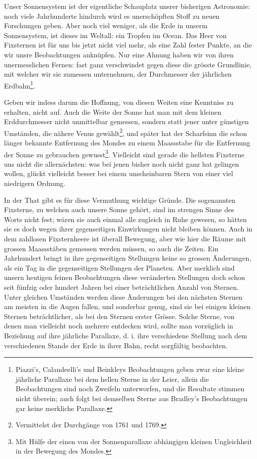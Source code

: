 \documentclass[10pt,a4paper]{article}
\begin{document}
Unser Sonnensystem ist der eigentliche Schauplatz unsrer bisherigen Astronomie: noch viele Jahrhunderte hindurch wird es unerschöpften Stoff zu neuen Forschungen geben. Aber noch viel weniger, als die Erde in unserm Sonnensystem, ist dieses im Weltall: ein Tropfen im Ocean. Das Heer von Fixsternen ist für uns bis jetzt nicht viel mehr, als eine Zahl fester Punkte, an die wir unsre Beobachtungen anknüpfen. Nur eine Ahnung haben wir von ihren unermesslichen Fernen: fast ganz verschwindet gegen diese die grösste Grundlinie, mit welcher wir sie zumessen unternehmen, der Durchmesser der jährlichen Erdbahn\footnote{Piazzi's, Calandeelli's und Beinkleys Beobachtungen geben zwar eine kleine jährliche Parallaxe bei dem hellen Sterne in der Leier, allein die Beobachtungen sind noch Zweifeln unterworfen, und die Resultate stimmen nicht überein; auch folgt bei demselben Sterne aus Bradley's Beobachtungen gar keine merkliche Parallaxe.}.

Geben wir indess darum die Hoffnung, von diesen Weiten eine Kenntniss zu erhalten, nicht auf. Auch die Weite der Sonne hat man mit dem kleinen Erddurchmesser nicht unmittelbar gemessen, sondern statt jener unter günstigen Umständen, die nähere Venus gewählt\footnote{Vermittelst der Durchgänge von 1761 und 1769.}, und später hat der Scharfsinn die schon länger bekannte Entfernung des Mondes zu einem Maassstabe für die Entfernung der Sonne zu gebrauchen gewusst\footnote{Mit Hülfe der einen von der Sonnenparallaxe abhängigen kleinen Ungleichheit in der Bewegung des Mondes.}. Vielleicht sind gerade die hellsten Fixsterne uns nicht die allernächsten: was bei jenen bisher noch nicht ganz hat gelingen wollen, glückt vielleicht besser bei einem unscheinbaren Stern von einer viel niedrigern Ordnung.

\clearpage
\noindent
In der That gibt es für diese Vermuthung wichtige Gründe. Die sogenannten Fixsterne, zu welchen auch unsere Sonne gehört, sind im strengen Sinne des Worts nicht fest; wären sie auch einmal alle zugleich in Ruhe gewesen, so hätten sie es doch wegen ihrer gegenseitigen Einwirkungen nicht bleiben können. Auch in dem zahllosen Fixsternheere ist überall Bewegung, aber wie hier die Räume mit grossen Maassstäben gemessen werden müssen, so auch die Zeiten. Ein Jahrhundert bringt in ihre gegenseitigen Stellungen keine so grossen Änderungen, als ein Tag in die gegenseitigen Stellungen der Planeten. Aber merklich sind unsern heutigen feinen Beobachtungen diese veränderten Stellungen doch schon seit fünfzig oder hundert Jahren bei einer beträchtlichen Anzahl von Sternen. Unter gleichen Umständen werden diese Änderungen bei den nächsten Sternen am meisten in die Augen fallen, und sonderbar genug, sind sie bei einigen kleinen Sternen beträchtlicher, als bei den Sternen erster Grösse. Solche Sterne, von denen man vielleicht noch mehrere entdecken wird, sollte man vorzüglich in Beziehung auf ihre jährliche Parallaxe, d. i. ihre verschiedene Stellung nach dem verschiedenen Stande der Erde in ihrer Bahn, recht sorgfältig beobachten.
\end{document}
